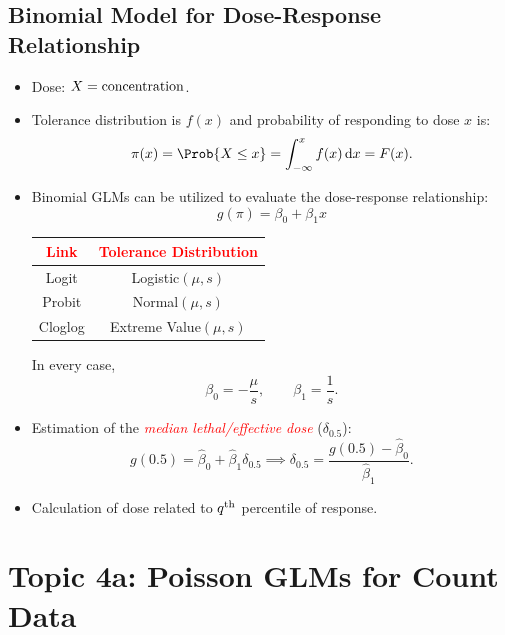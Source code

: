 \documentclass{article}\usepackage[]{graphicx}\usepackage[svgnames]{xcolor}
\let\log\relax%
\begin{document}
\subsection*{Binomial Model for Dose-Response Relationship}
\begin{itemize}
      \item Dose: $ X=\log{\text{concentration}} $.
      \item Tolerance distribution is $ f(x) $ and probability of responding to dose $ x $ is:
            \[ \pi(x)=\Prob{X\le x}=\int_{-\infty}^{x}f(x)\odif{x}=F(x). \]
      \item Binomial GLMs can be utilized to evaluate the dose-response relationship:
            \[ g(\pi)=\beta_0+\beta_1x \]
            \begin{table}[!htbp]
                  \centering
                  \begin{tabular}{cc}
                        \toprule
                        \textcolor{Red}{Link} & \textcolor{Red}{Tolerance Distribution} \\
                        \midrule
                        Logit                 & Logistic$(\mu,s)$                       \\
                        Probit                & Normal$(\mu,s)$                         \\
                        Cloglog               & Extreme Value$(\mu,s)$                  \\
                        \bottomrule
                  \end{tabular}
            \end{table}
            In every case,
            \[ \beta_0=-\frac{\mu}{s},\qquad \beta_1=\frac{1}{s}. \]
      \item Estimation of the \textcolor{Red}{\emph{median lethal/effective dose}} ($ \delta_{0.5} $):
            \[ g(0.5)=\hat{\beta}_0+\hat{\beta}_1\delta_{0.5}\implies \delta_{0.5}=\frac{g(0.5)-\hat{\beta}_0}{\hat{\beta}_1}.  \]
      \item Calculation of dose related to $ q\textsuperscript{th} $ percentile of response.
\end{itemize}

\section*{Topic 4a: Poisson GLMs for Count Data}
\end{document}
